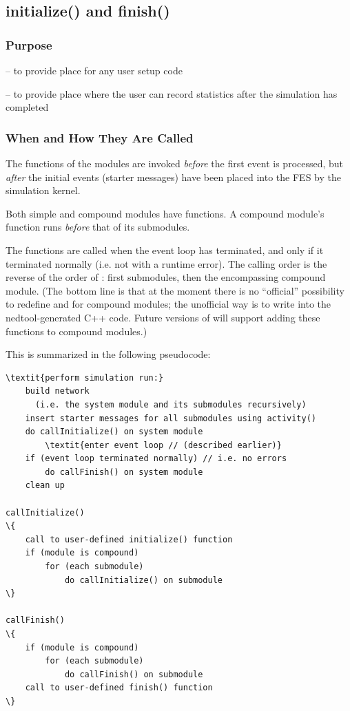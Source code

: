 \subsection{initialize() and finish()}
\label{sec:simple-modules:initialize-and-finish}

\subsubsection{Purpose}


 -- to provide place for any user setup code

 -- to provide place where the user can record statistics
after the simulation has completed


\subsubsection{When and How They Are Called}


The  functions of the modules are invoked
\textit{before} the first event is processed, but \textit{after} the
initial events (starter messages) have been
placed into the FES by the simulation kernel.


Both simple and compound modules have  functions.
A compound module's  function runs
\textit{before} that of its submodules.


The  functions are called when the event
loop has terminated, and only if it terminated
normally (i.e. not with a runtime error).  The calling order is the
reverse of the order of : first submodules, then the
encompassing compound module. (The bottom line is that at the moment
there is no ``official'' possibility to redefine 
and  for compound modules; the unofficial way is to
write into the nedtool-generated C++ code. Future versions of {\opp} will
support adding these functions to compound modules.)

This is summarized in the following pseudocode:


\begin{Verbatim}[commandchars=\\\{\}]
\textit{perform simulation run:}
    build network
      (i.e. the system module and its submodules recursively)
    insert starter messages for all submodules using activity()
    do callInitialize() on system module
        \textit{enter event loop // (described earlier)}
    if (event loop terminated normally) // i.e. no errors
        do callFinish() on system module
    clean up

callInitialize()
\{
    call to user-defined initialize() function
    if (module is compound)
        for (each submodule)
            do callInitialize() on submodule
\}

callFinish()
\{
    if (module is compound)
        for (each submodule)
            do callFinish() on submodule
    call to user-defined finish() function
\}
\end{Verbatim}



